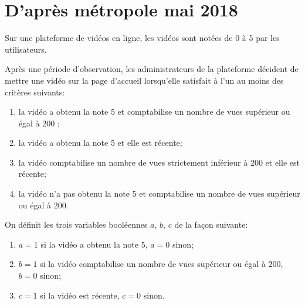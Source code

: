 \documentclass[a4paper,12pt]{article}
\begin{document}

\section*{D'après métropole mai 2018}

Sur une plateforme de vidéos en ligne, les vidéos sont notées de 0 à 5 par les utilisateurs.

Après une période d'observation, les administrateurs de la plateforme décident de mettre une vidéo
sur la page d'accueil lorsqu'elle satisfait à l'un au moins des critères suivants:
\begin{enumerate}[--]
    \item la vidéo a obtenu la note 5 et comptabilise un nombre de vues supérieur ou égal à 200 ;
    \item la vidéo a obtenu la note 5 et elle est récente;
    \item la vidéo comptabilise un nombre de vues strictement inférieur à 200 et elle est récente;
    \item la vidéo n'a pas obtenu la note 5 et comptabilise un nombre de vues supérieur ou égal à 200.
\end{enumerate}

\smallskip

On définit les trois variables booléennes $a$, $b$, $c$ de la façon suivante:

\setlength\parindent{1cm}
\begin{enumerate}[--]
    \item $a = 1$ si la vidéo a obtenu la note 5, $a = 0$ sinon;
    \item $b = 1$ si la vidéo comptabilise un nombre de vues supérieur ou égal à $200$, $b = 0$ sinon;
    \item $c = 1$ si la vidéo est récente, $c = 0$ sinon.
\end{enumerate}
\setlength\parindent{0cm}

\medskip
\end{document}
